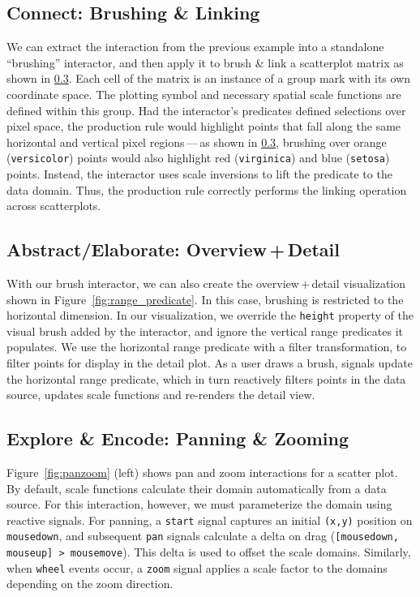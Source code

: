 \subsection{Connect: Brushing \& Linking}

We can extract the interaction from the previous example into a standalone
``brushing'' interactor, and then apply it to brush \& link a scatterplot matrix
as shown in \cref{}. Each cell of the matrix is an instance of a
group mark with its own coordinate space. The plotting symbol and necessary
spatial scale functions are defined within this group. Had the interactor's
predicates defined selections over pixel space, the production rule would
highlight points that fall along the same horizontal and vertical pixel
regions\,---\,as shown in \cref{}\todo{}, brushing over orange
(\texttt{versicolor}) points would also highlight red (\texttt{virginica}) and
blue (\texttt{setosa}) points. Instead, the interactor uses scale inversions to
lift the predicate to the data domain. Thus, the production rule correctly
performs the linking operation across scatterplots.

\subsection{Abstract/Elaborate: Overview\,+\,Detail}

With our brush interactor, we can also create the overview\,+\,detail
visualization shown in Figure~\ref{fig:range_predicate}. In this case, brushing
is restricted to the horizontal dimension. In our visualization, we override the
\texttt{height} property of the visual brush added by the interactor, and ignore
the vertical range predicates it populates. We use the horizontal range
predicate with a filter transformation, to filter points for display in the
detail plot. As a user draws a brush, signals update the horizontal range
predicate, which in turn reactively filters points in the data source, updates
scale functions and re-renders the detail view.

\subsection{Explore \& Encode: Panning \& Zooming}

Figure~\ref{fig:panzoom} (left) shows pan and zoom interactions for a scatter
plot. By default, scale functions calculate their domain automatically from a
data source. For this interaction, however, we must parameterize the domain
using reactive signals. For panning, a \texttt{start} signal captures an initial
\texttt{(x,y)} position on \texttt{mousedown}, and subsequent \texttt{pan}
signals calculate a delta on drag (\texttt{[mousedown, mouseup] > mousemove}).
This delta is used to offset the scale domains. Similarly, when \texttt{wheel}
events occur, a \texttt{zoom} signal applies a scale factor to the domains
depending on the zoom direction.


